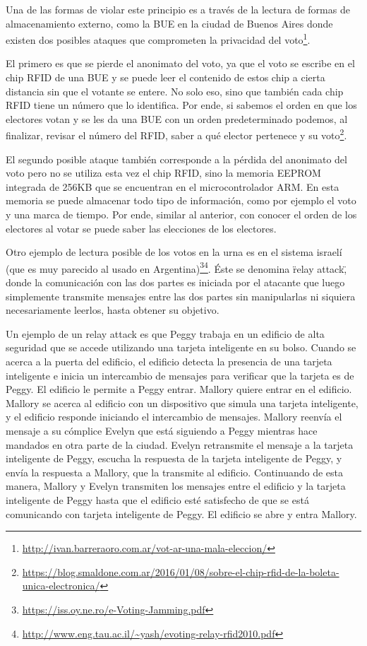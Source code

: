 Una de las formas de violar este principio es a través de la lectura de formas de almacenamiento externo, como la BUE en la ciudad de Buenos Aires donde existen dos posibles ataques que comprometen la privacidad del voto\footnote{\url{http://ivan.barreraoro.com.ar/vot-ar-una-mala-eleccion/}}.

El primero es que se pierde el anonimato del voto, ya que el voto se escribe en el chip RFID de una BUE y se puede leer el contenido de estos chip a cierta distancia sin que el votante se entere. No solo eso, sino que también cada chip RFID tiene un número que lo identifica. Por ende, si sabemos el orden en que los electores votan y se les da una BUE con un orden predeterminado podemos, al finalizar, revisar el número del RFID, saber a qué elector pertenece y su voto\footnote{\url{https://blog.smaldone.com.ar/2016/01/08/sobre-el-chip-rfid-de-la-boleta-unica-electronica/}}.

El segundo posible ataque también corresponde a la pérdida del anonimato del voto pero no se utiliza esta vez el chip RFID, sino la memoria EEPROM integrada de 256KB que se encuentran en el microcontrolador ARM. En esta memoria se puede almacenar todo tipo de información, como por ejemplo el voto y una marca de tiempo. Por ende, similar al anterior, con conocer el orden de los electores al votar se puede saber las elecciones de los electores.

Otro ejemplo de lectura posible de los votos en la urna es en el sistema israelí (que es muy parecido al usado en Argentina)\footnote{\url{https://iss.oy.ne.ro/e-Voting-Jamming.pdf}}\footnote{\url{http://www.eng.tau.ac.il/~yash/evoting-relay-rfid2010.pdf}}. Éste se denomina \"relay attack\", donde la comunicación con las dos partes es iniciada por el atacante que luego simplemente transmite mensajes entre las dos partes sin manipularlas ni siquiera necesariamente leerlos, hasta obtener su objetivo.

Un ejemplo de un relay attack es que Peggy trabaja en un edificio de alta seguridad que se accede utilizando una tarjeta inteligente en su bolso. Cuando se acerca a la puerta del edificio, el edificio detecta la presencia de una tarjeta inteligente e inicia un intercambio de mensajes para verificar que la tarjeta es de Peggy. El edificio le permite a Peggy entrar. Mallory quiere entrar en el edificio. Mallory se acerca al edificio con un dispositivo que simula una tarjeta inteligente, y el edificio responde iniciando el intercambio de mensajes. Mallory reenvía el mensaje a su cómplice Evelyn que está siguiendo a Peggy mientras hace mandados en otra parte de la ciudad. Evelyn retransmite el mensaje a la tarjeta inteligente de Peggy, escucha la respuesta de la tarjeta inteligente de Peggy, y envía la respuesta a Mallory, que la transmite al edificio. Continuando de esta manera, Mallory y Evelyn transmiten los mensajes entre el edificio y la tarjeta inteligente de Peggy hasta que el edificio esté satisfecho de que se está comunicando con tarjeta inteligente de Peggy. El edificio se abre y entra Mallory.

